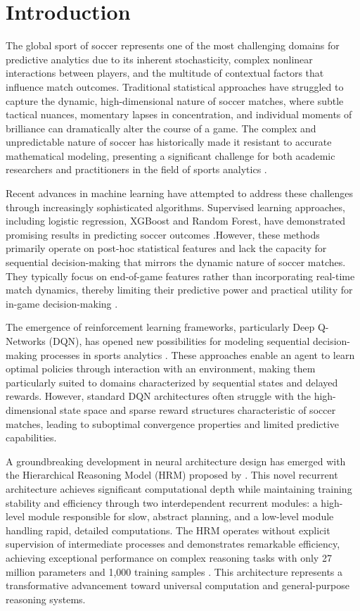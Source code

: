 \documentclass[3p,times,procedia]{elsarticle}
\begin{document}
\section{Introduction}
The global sport of soccer represents one of the most challenging domains for predictive analytics due to its inherent stochasticity, complex nonlinear interactions between players, and the multitude of contextual factors that influence match outcomes. Traditional statistical approaches have struggled to capture the dynamic, high-dimensional nature of soccer matches, where subtle tactical nuances, momentary lapses in concentration, and individual moments of brilliance can dramatically alter the course of a game. The complex and unpredictable nature of soccer has historically made it resistant to accurate mathematical modeling, presenting a significant challenge for both academic researchers and practitioners in the field of sports analytics \cite{rico2023machine}.

Recent advances in machine learning have attempted to address these challenges through increasingly sophisticated algorithms. Supervised learning approaches, including logistic regression, XGBoost and Random Forest, have demonstrated promising results in predicting soccer outcomes \cite{atta2024data}.However, these methods primarily operate on post-hoc statistical features and lack the capacity for sequential decision-making that mirrors the dynamic nature of soccer matches. They typically focus on end-of-game features rather than incorporating real-time match dynamics, thereby limiting their predictive power and practical utility for in-game decision-making .

The emergence of reinforcement learning frameworks, particularly Deep Q-Networks (DQN), has opened new possibilities for modeling sequential decision-making processes in sports analytics \cite{shaviroreinforcement,rahimian2024game}. These approaches enable an agent to learn optimal policies through interaction with an environment, making them particularly suited to domains characterized by sequential states and delayed rewards. However, standard DQN architectures often struggle with the high-dimensional state space and sparse reward structures characteristic of soccer matches, leading to suboptimal convergence properties and limited predictive capabilities.

A groundbreaking development in neural architecture design has emerged with the Hierarchical Reasoning Model (HRM) proposed by \cite{wang2025hierarchical}. This novel recurrent architecture achieves significant computational depth while maintaining training stability and efficiency through two interdependent recurrent modules: a high-level module responsible for slow, abstract planning, and a low-level module handling rapid, detailed computations. The HRM operates without explicit supervision of intermediate processes and demonstrates remarkable efficiency, achieving exceptional performance on complex reasoning tasks with only 27 million parameters and 1,000 training samples . This architecture represents a transformative advancement toward universal computation and general-purpose reasoning systems.
\end{document}
